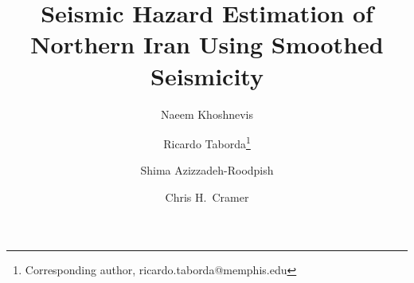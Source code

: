 \documentclass{article}
\begin{document}
\linenumbers

\title{\bf%
Seismic Hazard Estimation of Northern Iran Using Smoothed Seismicity
}

\author[1]{Naeem Khoshnevis}
\author[1,2]{Ricardo Taborda\thanks{Corresponding author, ricardo.taborda@memphis.edu}}
\author[1,2]{Shima Azizzadeh-Roodpish}
\author[1]{Chris H.~Cramer}

\date{}

\maketitle

\begin{abstract}%

\end{abstract}





\end{document}
